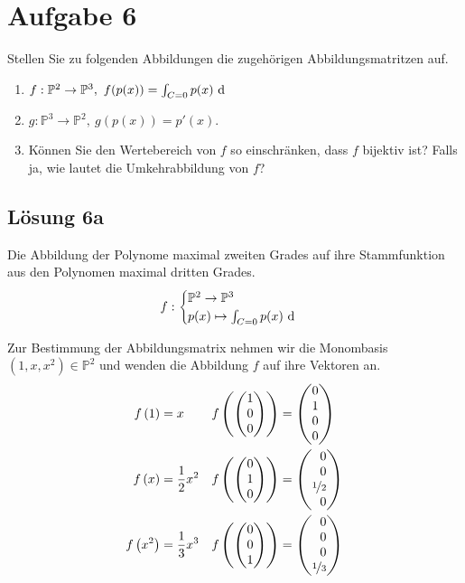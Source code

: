 \documentclass[main.tex]{subfiles}
\begin{document}
\section{Aufgabe 6}
Stellen Sie zu folgenden Abbildungen die zugehörigen Abbildungsmatritzen auf.

\begin{enumerate}
    \item $f: \mathbb{P}^2 \to \mathbb{P}^3, \ f(p(x)) = \int_{C=0} p(x) \dx$
    \item $g: \mathbb{P}^3 \to \mathbb{P}^2, \ g(p(x)) = p'(x).$
    \item Können Sie den Wertebereich von $f$ so einschränken, dass $f$ bijektiv ist? Falls ja, wie lautet die Umkehrabbildung von $f$?
\end{enumerate}

\subsection{Lösung 6a}
Die Abbildung der Polynome maximal zweiten Grades auf ihre Stammfunktion aus den Polynomen maximal dritten Grades.
$$
    f : \begin{cases}
        \mathbb{P}^2 \to \mathbb{P}^3\\
        p(x) \mapsto \int_{C=0} p(x) ~\mathrm{d}\end{cases}
$$

Zur Bestimmung der Abbildungsmatrix nehmen wir die Monombasis $(1, x, x^2) \in \mathbb{P}^2$ und wenden die Abbildung $f$ auf ihre Vektoren an. 
\begin{align*}
    f\left(1\right) &= x                 & f\left(\vektor{1\\0\\0}\right) &= \vektor{0\\1\\0\\0} \\
    f\left(x\right) &= \frac{1}{2} x^2   & f\left(\vektor{0\\1\\0}\right) &= \vektor{0\\0\\\nicefrac{1}{2}\\0} \\
    f\left(x^2\right) &= \frac{1}{3} x^3 & f\left(\vektor{0\\0\\1}\right) &= \vektor{0\\0\\0\\\nicefrac{1}{3}} \\
\end{align*}
\end{document}
